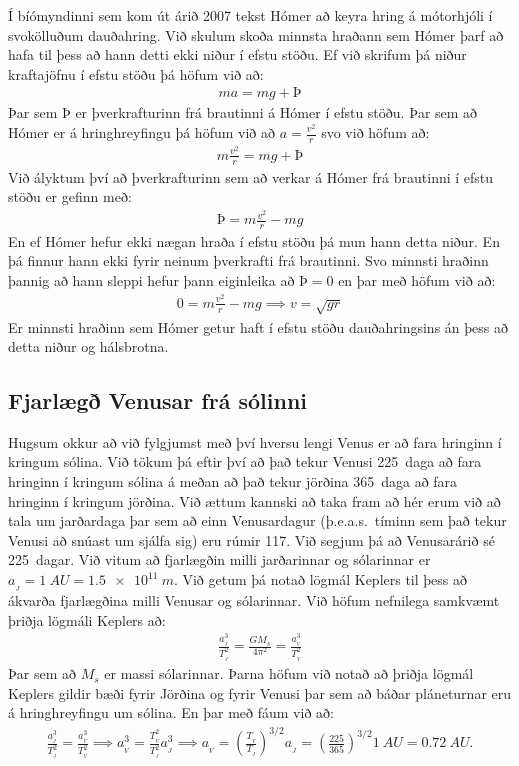 Í bíómyndinni  sem kom út árið 2007 tekst Hómer að keyra hring á mótorhjóli í svokölluðum dauðahring. Við skulum skoða minnsta hraðann sem Hómer þarf að hafa til þess að hann detti ekki niður í efstu stöðu. Ef við skrifum þá niður kraftajöfnu í efstu stöðu þá höfum við að:
\begin{align*}
    ma = mg + \text{Þ}
\end{align*}
Þar sem $\text{Þ}$ er þverkrafturinn frá brautinni á Hómer í efstu stöðu. Þar sem að Hómer er á hringhreyfingu þá höfum við að $a = \frac{v^2}{r}$ svo við höfum að:
\begin{align*}
    m \frac{v^2}{r} = mg + \text{Þ}
\end{align*}
Við ályktum því að þverkrafturinn sem að verkar á Hómer frá brautinni í efstu stöðu er gefinn með:
\begin{align*}
    \text{Þ} = m \frac{v^2}{r} - mg
\end{align*}
En ef Hómer hefur ekki nægan hraða í efstu stöðu þá mun hann detta niður. En þá finnur hann ekki fyrir neinum þverkrafti frá brautinni. Svo minnsti hraðinn þannig að hann sleppi hefur þann eiginleika að $\text{Þ} = 0$ en þar með höfum við að:
\begin{align*}
    0 = m \frac{v^2}{r} - mg \implies v = \sqrt{gr}
\end{align*}
Er minnsti hraðinn sem Hómer getur haft í efstu stöðu dauðahringsins án þess að detta niður og hálsbrotna.

\subsection*{Fjarlægð Venusar frá sólinni}

Hugsum okkur að við fylgjumst með því hversu lengi Venus er að fara hringinn í kringum sólina. Við tökum þá eftir því að það tekur Venusi \SI{225}{daga} að fara hringinn í kringum sólina á meðan að það tekur jörðina \SI{365}{daga} að fara hringinn í kringum jörðina. Við ættum kannski að taka fram að hér erum við að tala um jarðardaga þar sem að einn Venusardagur (þ.e.a.s.~tíminn sem það tekur Venusi að snúast um sjálfa sig) eru rúmir \SI{117}{}. Við segjum þá að Venusarárið sé \SI{225}{dagar}. Við vitum að fjarlægðin milli jarðarinnar og sólarinnar er $a_{_J} = \SI{1}{AU} = \SI{1.5e11}{m}$. Við getum þá notað lögmál Keplers til þess að ákvarða fjarlægðina milli Venusar og sólarinnar. Við höfum nefnilega samkvæmt þriðja lögmáli Keplers að:
\begin{align*}
    \frac{a_{_J}^3}{T_{_J}^2} = \frac{GM_s}{4\pi^2} = \frac{a_{_V}^3}{T_{_{V}}^2}
\end{align*}
Þar sem að $M_s$ er massi sólarinnar. Þarna höfum við notað að þriðja lögmál Keplers gildir bæði fyrir Jörðina og fyrir Venusi þar sem að báðar pláneturnar eru á hringhreyfingu um sólina. En þar með fáum við að:
\begin{align*}
   \frac{a_{_J}^3}{T_{_J}^2} =  \frac{a_{_V}^3}{T_{_V}^2} \implies a_{_V}^3 = \frac{T_{_V}^2}{T_{_J}^2} a_{_{J}}^3 \implies a_{_V} = \left(\frac{T_{_V}}{T_{_J}}\right)^{3/2} a_{_J} = \left( \frac{225}{365} \right)^{3/2} \SI{1}{AU} = \SI{0.72}{AU}.
\end{align*}

